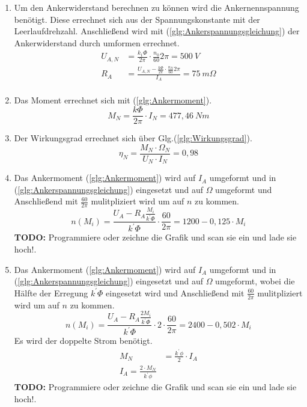 \begin{solution}
\begin{enumerate}
\item Um den Ankerwiderstand berechnen zu können wird die Ankernennspannung benötigt. Diese errechnet sich aus der Spannungskonstante mit der Leerlaufdrehzahl. Anschließend wird mit (\ref{glg:Ankerspannungsgleichung}) der Ankerwiderstand durch umformen errechnet.\\
\begin{align}
U_{A,N} &= \frac{k_1 \Phi}{2 \pi} \cdot \frac{n_0}{60} 2 \pi = 500~V\\
R_A &= \frac{U_{A,N} - \frac{k \Phi}{2 \pi} \cdot \frac{n_N}{60} 2 \pi}{I_A}=75~m \Omega\\
\end{align}
\item Das Moment errechnet sich mit (\ref{glg:Ankermoment}).\\
\begin{equation}
M_N=\frac{k \Phi}{2 \pi} \cdot I_N =477,46~Nm
\end{equation}
\item Der Wirkungsgrad errechnet sich über Glg.(\ref{glg:Wirkungsgrad}).
\begin{equation}
\eta_N = \frac{M_N \cdot \Omega_N}{U_N \cdot I_N} =0,98
\end{equation}
\item Das Ankermoment (\ref{glg:Ankermoment}) wird auf $I_A$ umgeformt und in (\ref{glg:Ankerspannungsgleichung}) eingesetzt und auf $\Omega$ umgeformt und Anschließend mit $\frac{60}{2 \pi}$ mulitpliziert wird um auf $n$ zu kommen.
\begin{equation}
n(M_i) = \frac{U_A - R_A \frac{ M_i}{k^{'} \Phi}}{k^{'}\Phi} \cdot \frac{60}{2 \pi} =1200-0,125 \cdot M_i
\end{equation}
\textbf{TODO:} Programmiere oder zeichne die Grafik und scan sie ein und lade sie hoch!.\\
\item Das Ankermoment (\ref{glg:Ankermoment}) wird auf $I_A$ umgeformt und in (\ref{glg:Ankerspannungsgleichung}) eingesetzt und auf $\Omega$ umgeformt, wobei die Hälfte der Erregung $k^{'} \Phi$ eingesetzt wird und Anschließend mit $\frac{60}{2 \pi}$ mulitpliziert wird um auf $n$ zu kommen.
\begin{equation}
n(M_i) = \frac{U_A - R_A \frac{2 M_i}{k^{'} \Phi}}{k^{'}\Phi} \cdot 2 \cdot \frac{60}{2 \pi} =2400-0,502 \cdot M_i
\end{equation}
Es wird der doppelte Strom benötigt.
\begin{align}
M_N &= \frac{k^{'} \phi}{2} \cdot I_A\\
I_A = \frac{2 \cdot M_N}{k^{'} \phi}
\end{align}
\textbf{TODO:} Programmiere oder zeichne die Grafik und scan sie ein und lade sie hoch!.\\
\end{enumerate}
\end{solution}